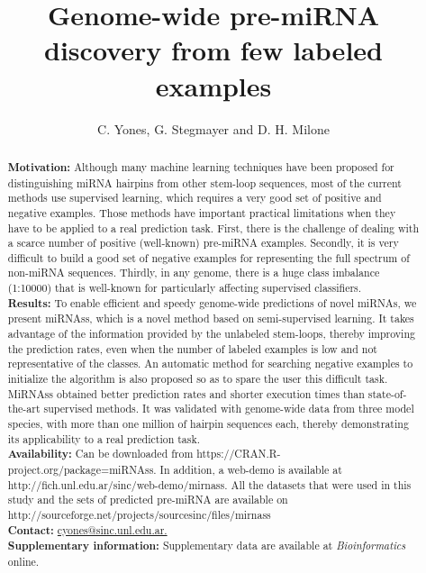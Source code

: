 \documentclass{article}
\title{\normalfont Genome-wide pre-miRNA discovery from few labeled examples}
\date{}
\author{C. Yones, G. Stegmayer and D. H. Milone}
\affil{\small  Research Institute for Signals, Systems and Computational Intelligence, sinc(\textit{i}), FICH-UNL, CONICET, Santa Fe, Argentina.}
\begin{document}
\maketitle

\begin{abstract}
	\noindent \textbf{Motivation:} Although many machine learning techniques have been proposed for distinguishing miRNA hairpins from other stem-loop sequences, most of the current methods use supervised learning, which requires a very good set of positive and negative examples. Those methods have important practical limitations when they have to be applied to a real prediction task. First, there is the challenge of dealing with a scarce number of positive (well-known) pre-miRNA examples. Secondly, it is very difficult to build a good set of negative examples for representing the full spectrum of non-miRNA sequences. Thirdly, in any genome, there is a huge class imbalance (1:10000) that is well-known for particularly affecting supervised classifiers.  \\
	\textbf{Results:} To enable efficient and speedy genome-wide predictions of novel miRNAs, we present miRNAss, which is a novel method based on semi-supervised learning. It  takes advantage of the information provided by the unlabeled stem-loops, thereby improving the prediction rates, even when the number of labeled examples is low and not representative of the classes. An automatic method for searching negative examples to initialize the algorithm is also proposed so as to spare the user this difficult task. MiRNAss obtained better prediction rates and shorter execution times than state-of-the-art supervised methods. It was validated with genome-wide data from three model species, with more than one million of hairpin sequences each, thereby demonstrating its applicability to a real prediction task. \\
	\textbf{Availability:} Can be downloaded from https://CRAN.R-project.org/package=miRNAss. In addition, a web-demo is available at http://fich.unl.edu.ar/sinc/web-demo/mirnass. All the datasets that were used in this study and the sets of predicted pre-miRNA are available on http://sourceforge.net/projects/sourcesinc/files/mirnass \\
	\textbf{Contact:} \href{cyones@sinc.unl.edu.ar}{cyones@sinc.unl.edu.ar.} \\
	\textbf{Supplementary information:} Supplementary data are available at \textit{Bioinformatics} online.
\end{abstract}
\end{document}
